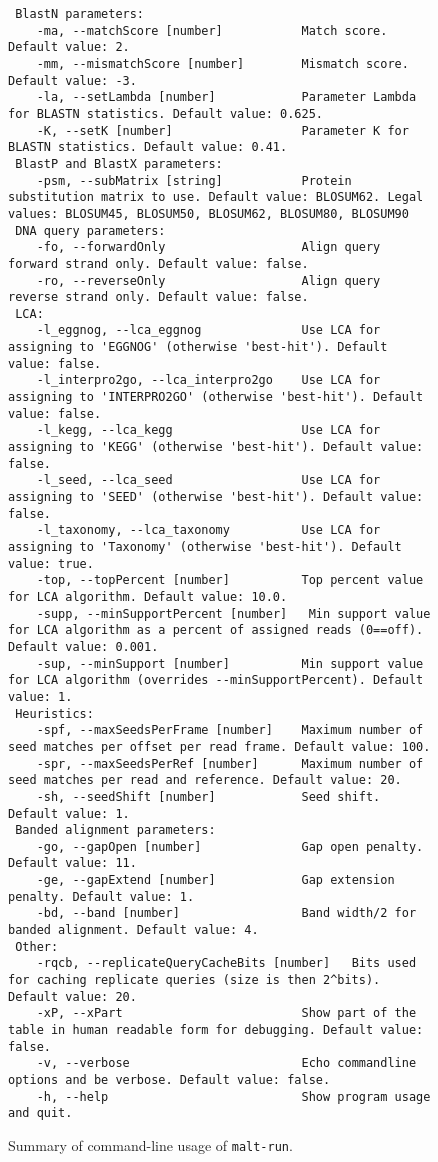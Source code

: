 \documentclass[11pt]{article}
\begin{document}
\begin{figure}[h]
{\begin{verbatim}
 BlastN parameters:
	-ma, --matchScore [number]           Match score. Default value: 2.
	-mm, --mismatchScore [number]        Mismatch score. Default value: -3.
	-la, --setLambda [number]            Parameter Lambda for BLASTN statistics. Default value: 0.625.
	-K, --setK [number]                  Parameter K for BLASTN statistics. Default value: 0.41.
 BlastP and BlastX parameters:
	-psm, --subMatrix [string]           Protein substitution matrix to use. Default value: BLOSUM62. Legal values: BLOSUM45, BLOSUM50, BLOSUM62, BLOSUM80, BLOSUM90
 DNA query parameters:
	-fo, --forwardOnly                   Align query forward strand only. Default value: false.
	-ro, --reverseOnly                   Align query reverse strand only. Default value: false.
 LCA:
	-l_eggnog, --lca_eggnog              Use LCA for assigning to 'EGGNOG' (otherwise 'best-hit'). Default value: false.
	-l_interpro2go, --lca_interpro2go    Use LCA for assigning to 'INTERPRO2GO' (otherwise 'best-hit'). Default value: false.
	-l_kegg, --lca_kegg                  Use LCA for assigning to 'KEGG' (otherwise 'best-hit'). Default value: false.
	-l_seed, --lca_seed                  Use LCA for assigning to 'SEED' (otherwise 'best-hit'). Default value: false.
	-l_taxonomy, --lca_taxonomy          Use LCA for assigning to 'Taxonomy' (otherwise 'best-hit'). Default value: true.
	-top, --topPercent [number]          Top percent value for LCA algorithm. Default value: 10.0.
	-supp, --minSupportPercent [number]   Min support value for LCA algorithm as a percent of assigned reads (0==off). Default value: 0.001.
	-sup, --minSupport [number]          Min support value for LCA algorithm (overrides --minSupportPercent). Default value: 1.
 Heuristics:
	-spf, --maxSeedsPerFrame [number]    Maximum number of seed matches per offset per read frame. Default value: 100.
	-spr, --maxSeedsPerRef [number]      Maximum number of seed matches per read and reference. Default value: 20.
	-sh, --seedShift [number]            Seed shift. Default value: 1.
 Banded alignment parameters:
	-go, --gapOpen [number]              Gap open penalty. Default value: 11.
	-ge, --gapExtend [number]            Gap extension penalty. Default value: 1.
	-bd, --band [number]                 Band width/2 for banded alignment. Default value: 4.
 Other:
	-rqcb, --replicateQueryCacheBits [number]   Bits used for caching replicate queries (size is then 2^bits). Default value: 20.
	-xP, --xPart                         Show part of the table in human readable form for debugging. Default value: false.
	-v, --verbose                        Echo commandline options and be verbose. Default value: false.
	-h, --help                           Show program usage and quit.\end{verbatim}
}
\caption{Summary of command-line usage of {\tt malt-run}.}\label{fig:malt-run-usage}
\end{figure}


\FloatBarrier

{\small


}

\printindex
\end{document}
